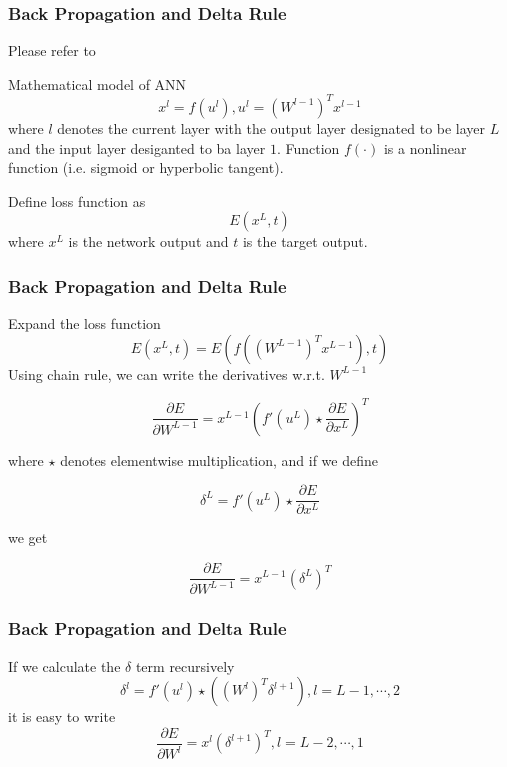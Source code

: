 \documentclass{beamer}
\begin{document}
\begin{frame}
\frametitle{Back Propagation and Delta Rule}
Please refer to \href{http://caffe.stevenho.me/cnn_tutorial.pdf}{\color{blue}{this page}}\par
Mathematical model of ANN
\begin{equation*}
x^{l}=f(u^{l}), u^{l}=(W^{l-1})^{T}x^{l-1}
\end{equation*}
where $l$ denotes the current layer with the output layer designated to be layer $L$ and the input layer desiganted to ba layer $1$. Function $f(\cdot)$ is a nonlinear function (i.e. sigmoid or hyperbolic tangent).\par
Define loss function as
\begin{equation*}
E(x^{L},t)
\end{equation*}
where $x^{L}$ is the network output and $t$ is the target output.
\end{frame}

\begin{frame}
\frametitle{Back Propagation and Delta Rule}
Expand the loss function
\begin{equation*}
E(x^{L},t)=E(f((W^{L-1})^{T}x^{L-1}),t)
\end{equation*}
Using chain rule, we can write the derivatives w.r.t. $W^{L-1}$\par
\begin{equation*}
\frac{\partial E}{\partial W^{L-1}}=x^{L-1}(f'(u^{L})\star\frac{\partial E}{\partial x^{L}})^{T}
\end{equation*}\par
where $\star$ denotes elementwise multiplication, and if we define\par
\begin{equation*}
\delta^{L}=f'(u^{L})\star\frac{\partial E}{\partial x^{L}}
\end{equation*}\par
we get\par
\begin{equation*}
\frac{\partial E}{\partial W^{L-1}}=x^{L-1}(\delta^{L})^{T}
\end{equation*}\par
\end{frame}

\begin{frame}
\frametitle{Back Propagation and Delta Rule}
If we calculate the $\delta$ term recursively
\begin{equation*}
\delta^{l}=f'(u^{l})\star((W^{l})^{T}\delta^{l+1}),l=L-1,\cdots,2
\end{equation*}
it is easy to write
\begin{equation*}
\frac{\partial E}{\partial W^{l}}=x^{l}(\delta^{l+1})^{T},l=L-2,\cdots,1
\end{equation*}
\end{frame}
\end{document}
